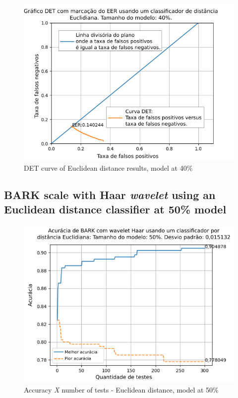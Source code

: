 \begin{figure}[!ht]
	\centering
	\includegraphics[width=\linewidth]{images/results/det/DET_for_classifier_Euclidian_40}
	\caption{DET curve of Euclidean distance results, model at 40\%}
	\label{fig:detforclassifiereuclidian40}
\end{figure}

\subsection{BARK scale with Haar \textit{wavelet} using an Euclidean distance classifier at 50\% model}



\begin{figure}[!ht]
	\centering
	\includegraphics[width=\linewidth]{images/results/confusionMatrices/classifier_Euclidian_50}
	\caption{Accuracy \textit{X} number of tests - Euclidean distance, model at 50\%}
	\label{fig:classifiereuclidian50}
\end{figure}

